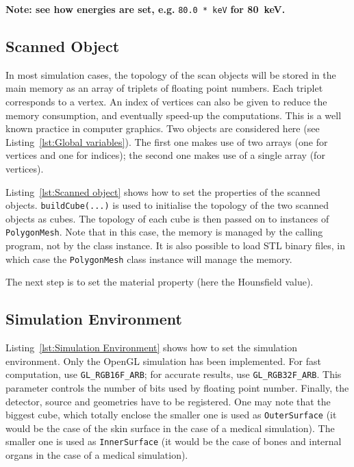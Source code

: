 \documentclass[11pt,oneside,a4paper,final]{article}
\begin{document}
\textbf{Note: see how energies are set, e.g.} \verb+80.0 * keV+\textbf{ for 80~\acrshort{keV}.}

\subsection{Scanned Object}

%



In most simulation cases, the topology of the scan objects will be stored in the main memory as an array of triplets of floating point numbers. 
Each triplet corresponds to a vertex. 
An index of vertices can also be given to reduce the memory consumption, and eventually speed-up the computations. 
This is a well known practice in computer graphics.
Two objects are considered here (see Listing~\ref{lst:Global variables}). 
The first one makes use of two arrays (one for vertices and one for indices); the second one makes use of a single array (for vertices).

Listing~\ref{lst:Scanned object} shows how to set the properties of the scanned objects. 
\verb+buildCube(...)+ is used to initialise the topology of the two scanned objects as cubes. 
The topology of each cube is then passed on to instances of \verb+PolygonMesh+. 
Note that in this case, the memory is managed by the calling program, not by the class instance. 
It is also possible to load \Gls{STL} binary files, in which case the \verb+PolygonMesh+ class instance will manage the memory. 

The next step is to set the material property (here the Hounsfield value). 


\subsection{Simulation Environment}



Listing~\ref{lst:Simulation Environment} shows how to set the simulation environment. 
Only the OpenGL simulation has been implemented. 
For fast computation, use \verb+GL_RGB16F_ARB+; for accurate results, use \verb+GL_RGB32F_ARB+. 
This parameter controls the number of bits used by floating point number. 
Finally, the detector, source and geometries have to be registered. 
One may note that the biggest cube, which totally enclose the smaller one is used as \verb+OuterSurface+ (it would be the case of the skin surface in the case of a medical simulation).
The smaller one is used as \verb+InnerSurface+ (it would be the case of bones and internal organs in the case of a medical simulation).
\end{document}
